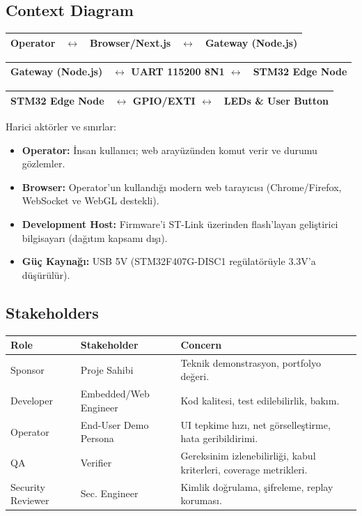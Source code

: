 \subsection{Context Diagram}
\begin{center}
\begin{tabular}{|c|c|c|c|c|}
\hline
\textbf{Operator} & $\leftrightarrow$ & \textbf{Browser/Next.js} & $\leftrightarrow$ & \textbf{Gateway (Node.js)} \\
\hline
\end{tabular}

\vspace{0.2cm}
\begin{tabular}{|c|c|c|}
\hline
\textbf{Gateway (Node.js)} & $\leftrightarrow$ UART 115200 8N1 $\leftrightarrow$ & \textbf{STM32 Edge Node} \\
\hline
\end{tabular}

\vspace{0.2cm}
\begin{tabular}{|c|c|c|}
\hline
\textbf{STM32 Edge Node} & $\leftrightarrow$ GPIO/EXTI $\leftrightarrow$ & \textbf{LEDs \& User Button} \\
\hline
\end{tabular}
\end{center}

Harici aktörler ve sınırlar:
\begin{itemize}
    \item \textbf{Operator:} İnsan kullanıcı; web arayüzünden komut verir ve durumu gözlemler.
    \item \textbf{Browser:} Operator'un kullandığı modern web tarayıcısı (Chrome/Firefox, WebSocket ve WebGL destekli).
    \item \textbf{Development Host:} Firmware'i ST-Link üzerinden flash'layan geliştirici bilgisayarı (dağıtım kapsamı dışı).
    \item \textbf{Güç Kaynağı:} USB 5V (STM32F407G-DISC1 regülatörüyle 3.3V'a düşürülür).
\end{itemize}

\subsection{Stakeholders}
\begin{tabularx}{\textwidth}{|l|l|X|}
\hline
\textbf{Role} & \textbf{Stakeholder} & \textbf{Concern} \\
\hline
Sponsor & Proje Sahibi & Teknik demonstrasyon, portfolyo değeri. \\
\hline
Developer & Embedded/Web Engineer & Kod kalitesi, test edilebilirlik, bakım. \\
\hline
Operator & End-User Demo Persona & UI tepkime hızı, net görselleştirme, hata geribildirimi. \\
\hline
QA & Verifier & Gereksinim izlenebilirliği, kabul kriterleri, coverage metrikleri. \\
\hline
Security Reviewer & Sec. Engineer & Kimlik doğrulama, şifreleme, replay koruması. \\
\hline
\end{tabularx}


